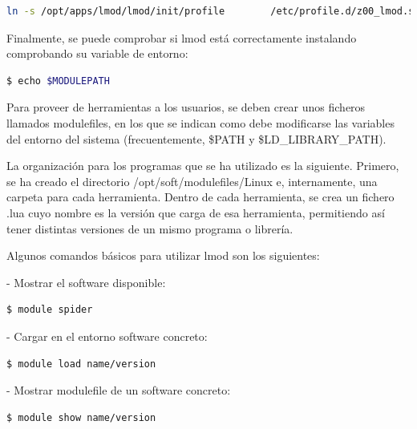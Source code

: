 \vspace{2mm}
\begin{lstlisting}[language=bash]
ln -s /opt/apps/lmod/lmod/init/profile        /etc/profile.d/z00_lmod.sh
\end{lstlisting}
\vspace{2mm}

Finalmente, se puede comprobar si lmod está correctamente instalando comprobando su variable de entorno:

\vspace{2mm}
\begin{lstlisting}[language=bash]
    $ echo $MODULEPATH
\end{lstlisting}
\vspace{2mm}

Para proveer de herramientas a los usuarios, se deben crear unos ficheros llamados modulefiles, en los que se indican como debe modificarse las variables del entorno del sistema (frecuentemente, \$PATH y \$LD\_LIBRARY\_PATH).
\vspace{2mm}

La organización para los programas que se ha utilizado es la siguiente. Primero, se ha creado el directorio /opt/soft/modulefiles/Linux e, internamente, una carpeta para cada herramienta. Dentro de cada herramienta, se crea un fichero .lua cuyo nombre es la versión que carga de esa herramienta, permitiendo así tener distintas versiones de un mismo programa o librería.
\vspace{4mm}

Algunos comandos básicos para utilizar lmod son los siguientes:
\vspace{4mm}

- Mostrar el software disponible:
\vspace{2mm}
\begin{lstlisting}[language=bash]
    $ module spider
\end{lstlisting}
\vspace{4mm}

- Cargar en el entorno software concreto:
\vspace{2mm}
\begin{lstlisting}[language=bash]
    $ module load name/version
\end{lstlisting}
\vspace{4mm}

- Mostrar modulefile de un software concreto:
\vspace{2mm}
\begin{lstlisting}[language=bash]
    $ module show name/version
\end{lstlisting}


